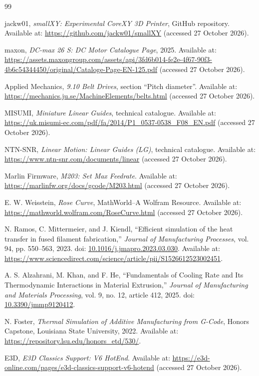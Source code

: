 \documentclass[11pt,a4paper]{article}
\begin{document}
\small
\begin{thebibliography}{99}

jackw01,
\textit{smallXY: Experimental CoreXY 3D Printer},
GitHub repository.
Available at: \url{https://github.com/jackw01/smallXY}
(accessed 27 October 2026).

maxon,
\textit{DC-max 26 S: DC Motor Catalogue Page},
2025.
Available at: \url{https://assets.maxongroup.com/assets/api/3fd6b014-fe2e-4f67-90f3-4b6c54344450/original/Cataloge-Page-EN-125.pdf}
(accessed 27 October 2026).

Applied Mechanics,
\textit{9.10 Belt Drives},
section ``Pitch diameter''.
Available at:
\url{https://mechanics.ju.se/MachineElements/belts.html}
(accessed 27 October 2026).

MISUMI,
\textit{Miniature Linear Guides},
technical catalogue.
Available at: \url{https://uk.misumi-ec.com/pdf/fa/2014/P1_0537-0538_F08_EN.pdf}
(accessed 27 October 2026).

NTN-SNR,
\textit{Linear Motion: Linear Guides (LG)},
technical catalogue.
Available at: \url{https://www.ntn-snr.com/documents/linear}
(accessed 27 October 2026).

Marlin Firmware,
\textit{M203: Set Max Feedrate}.
Available at: \url{https://marlinfw.org/docs/gcode/M203.html}
(accessed 27 October 2026).

E. W. Weisstein,
\textit{Rose Curve},
MathWorld--A Wolfram Resource.
Available at: \url{https://mathworld.wolfram.com/RoseCurve.html}
(accessed 27 October 2026).

N. Ramos, C. Mittermeier, and J. Kiendl,
``Efficient simulation of the heat transfer in fused filament fabrication,''
\textit{Journal of Manufacturing Processes},
vol. 94, pp. 550--563, 2023.
doi: \href{https://doi.org/10.1016/j.jmapro.2023.03.030}
{10.1016/j.jmapro.2023.03.030}.
Available at:
\url{https://www.sciencedirect.com/science/article/pii/S1526612523002451}.

A. S. Alzahrani, M. Khan, and F. He,
``Fundamentals of Cooling Rate and Its Thermodynamic Interactions in Material
Extrusion,''
\textit{Journal of Manufacturing and Materials Processing},
vol. 9, no. 12, article 412, 2025.
doi: \href{https://doi.org/10.3390/jmmp9120412}{10.3390/jmmp9120412}.

N. Foster,
\textit{Thermal Simulation of Additive Manufacturing from G-Code},
Honors Capstone, Louisiana State University, 2022.
Available at: \url{https://repository.lsu.edu/honors_etd/530/}.

E3D,
\textit{E3D Classics Support: V6 HotEnd}.
Available at: \url{https://e3d-online.com/pages/e3d-classics-support-v6-hotend}
(accessed 27 October 2026).

\end{thebibliography}
\end{document}
